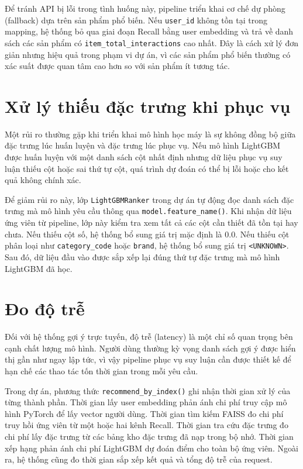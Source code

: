 Để tránh API bị lỗi trong tình huống này, pipeline triển khai cơ chế dự phòng (fallback) dựa trên sản phẩm phổ biến. Nếu \texttt{user\_id} không tồn tại trong mapping, hệ thống bỏ qua giai đoạn Recall bằng user embedding và trả về danh sách các sản phẩm có \texttt{item\_total\_interactions} cao nhất. Đây là cách xử lý đơn giản nhưng hiệu quả trong phạm vi dự án, vì các sản phẩm phổ biến thường có xác suất được quan tâm cao hơn so với sản phẩm ít tương tác.

\section{Xử lý thiếu đặc trưng khi phục vụ}
Một rủi ro thường gặp khi triển khai mô hình học máy là sự không đồng bộ giữa đặc trưng lúc huấn luyện và đặc trưng lúc phục vụ. Nếu mô hình LightGBM được huấn luyện với một danh sách cột nhất định nhưng dữ liệu phục vụ suy luận thiếu cột hoặc sai thứ tự cột, quá trình dự đoán có thể bị lỗi hoặc cho kết quả không chính xác.
\medskip

Để giảm rủi ro này, lớp \texttt{LightGBMRanker} trong dự án tự động đọc danh sách đặc trưng mà mô hình yêu cầu thông qua \texttt{model.feature\_name()}. Khi nhận dữ liệu ứng viên từ pipeline, lớp này kiểm tra xem tất cả các cột cần thiết đã tồn tại hay chưa. Nếu thiếu cột số, hệ thống bổ sung giá trị mặc định là 0.0. Nếu thiếu cột phân loại như \texttt{category\_code} hoặc \texttt{brand}, hệ thống bổ sung giá trị \texttt{<UNKNOWN>}. Sau đó, dữ liệu đầu vào được sắp xếp lại đúng thứ tự đặc trưng mà mô hình LightGBM đã học.

\section{Đo độ trễ}
Đối với hệ thống gợi ý trực tuyến, độ trễ (latency) là một chỉ số quan trọng bên cạnh chất lượng mô hình. Người dùng thường kỳ vọng danh sách gợi ý được hiển thị gần như ngay lập tức, vì vậy pipeline phục vụ suy luận cần được thiết kế để hạn chế các thao tác tốn thời gian trong mỗi yêu cầu.
\medskip

Trong dự án, phương thức \texttt{recommend\_by\_index()} ghi nhận thời gian xử lý của từng thành phần. Thời gian lấy user embedding phản ánh chi phí truy cập mô hình PyTorch để lấy vector người dùng. Thời gian tìm kiếm FAISS đo chi phí truy hồi ứng viên từ một hoặc hai kênh Recall. Thời gian tra cứu đặc trưng đo chi phí lấy đặc trưng từ các bảng kho đặc trưng đã nạp trong bộ nhớ. Thời gian xếp hạng phản ánh chi phí LightGBM dự đoán điểm cho toàn bộ ứng viên. Ngoài ra, hệ thống cũng đo thời gian sắp xếp kết quả và tổng độ trễ của request.
